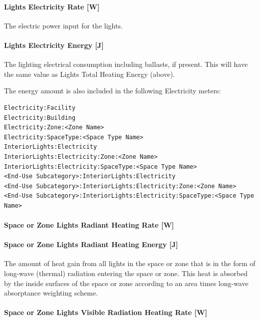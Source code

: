 \paragraph{Lights Electricity Rate {[}W{]}}\label{lights-electric-power-w}

The electric power input for the lights.

\paragraph{Lights Electricity Energy {[}J{]}}\label{lights-electric-energy-j}

The lighting electrical consumption including ballasts, if present. This will have the same value as Lights Total Heating Energy (above).

The energy amount is also included in the following Electricity meters:
\begin{lstlisting}
Electricity:Facility
Electricity:Building
Electricity:Zone:<Zone Name>
Electricity:SpaceType:<Space Type Name>
InteriorLights:Electricity
InteriorLights:Electricity:Zone:<Zone Name>
InteriorLights:Electricity:SpaceType:<Space Type Name>
<End-Use Subcategory>:InteriorLights:Electricity
<End-Use Subcategory>:InteriorLights:Electricity:Zone:<Zone Name>
<End-Use Subcategory>:InteriorLights:Electricity:SpaceType:<Space Type Name>
\end{lstlisting}

\paragraph{Space or Zone Lights Radiant Heating Rate {[}W{]}}\label{zone-lights-radiant-heating-rate-w}

\paragraph{Space or Zone Lights Radiant Heating Energy {[}J{]}}\label{zone-lights-radiant-heating-energy-j}

The amount of heat gain from all lights in the space or zone that is in the form of long-wave (thermal) radiation entering the space or zone. This heat is absorbed by the inside surfaces of the space or zone according to an area times long-wave absorptance weighting scheme.

\paragraph{Space or Zone Lights Visible Radiation Heating Rate {[}W{]}}\label{zone-lights-visible-radiation-heating-rate-w}

